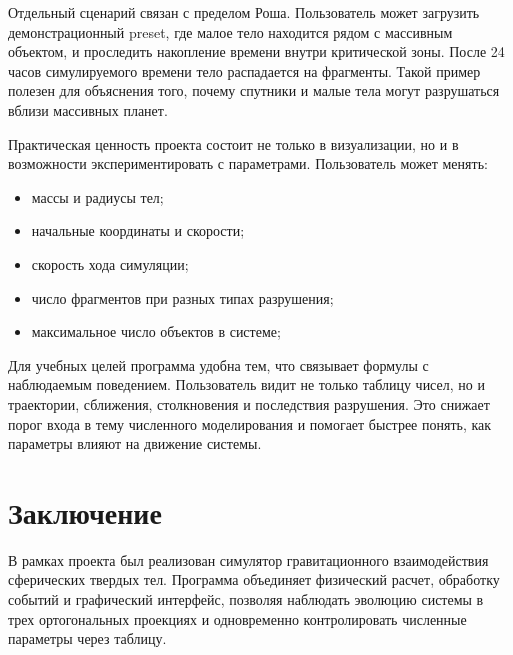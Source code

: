 \documentclass[14pt,a4paper]{extarticle}
\begin{document}
	Отдельный сценарий связан с пределом Роша. Пользователь может загрузить демонстрационный preset, где малое тело находится рядом с массивным объектом, и проследить накопление времени внутри критической зоны. После 24 часов симулируемого времени тело распадается на фрагменты. Такой пример полезен для объяснения того, почему спутники и малые тела могут разрушаться вблизи массивных планет.
	
	Практическая ценность проекта состоит не только в визуализации, но и в возможности экспериментировать с параметрами. Пользователь может менять:
	\begin{itemize}
		\item массы и радиусы тел;
		\item начальные координаты и скорости;
		\item скорость хода симуляции;
		\item число фрагментов при разных типах разрушения;
		\item максимальное число объектов в системе;
	\end{itemize}
	
	Для учебных целей программа удобна тем, что связывает формулы с наблюдаемым поведением. Пользователь видит не только таблицу чисел, но и траектории, сближения, столкновения и последствия разрушения. Это снижает порог входа в тему численного моделирования и помогает быстрее понять, как параметры влияют на движение системы.
	
	
	\section*{Заключение}
	
	В рамках проекта был реализован симулятор гравитационного взаимодействия сферических твердых тел. Программа объединяет физический расчет, обработку событий и графический интерфейс, позволяя наблюдать эволюцию системы в трех ортогональных проекциях и одновременно контролировать численные параметры через таблицу.
	
\end{document}
